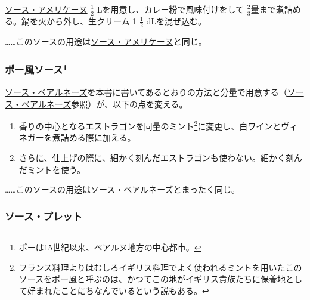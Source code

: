 \begin{recette}
\protect\hyperlink{sauce-americaine}{ソース・アメリケーヌ}
\(\frac{1}{2}\) Lを用意し、カレー粉で風味付けをして
\(\frac{2}{3}\)量まで煮詰める。鍋を火から外し、生クリーム 1
\(\frac{1}{2}\) dLを混ぜ込む。

\ldots{}\ldots{}このソースの用途は\protect\hyperlink{sauce-americaine}{ソース・アメリケーヌ}と同じ。

\hypertarget{sauce-paloise}{%
\subsubsection[ポー風ソース]{\texorpdfstring{ポー風ソース\footnote{ポーは15世紀以来、ベアルヌ地方の中心都市。}}{ポー風ソース}}\label{sauce-paloise}}



\protect\hyperlink{sauce-bearnaise}{ソース・ベアルネーズ}を本書に書いてあるとおりの方法と分量で用意する（\protect\hyperlink{sauce-bearnaise}{ソース・ベアルネーズ}参照）が、以下の点を変える。

\begin{enumerate}
\def\labelenumi{\arabic{enumi}.}
\item
  香りの中心となるエストラゴンを同量のミント\footnote{フランス料理よりはむしろイギリス料理でよく使われるミントを用いたこのソースをポー風と呼ぶのは、かつてこの地がイギリス貴族たちに保養地として好まれたことにちなんでいるという説もある。}に変更し、白ワインとヴィネガーを煮詰める際に加える。
\item
  さらに、仕上げの際に、細かく刻んだエストラゴンも使わない。細かく刻んだミントを使う。
\end{enumerate}

\ldots{}\ldots{}このソースの用途はソース・ベアルネーズとまったく同じ。

\hypertarget{sauce-poulette}{%
\subsubsection{ソース・プレット}\label{sauce-poulette}}



\end{recette}
